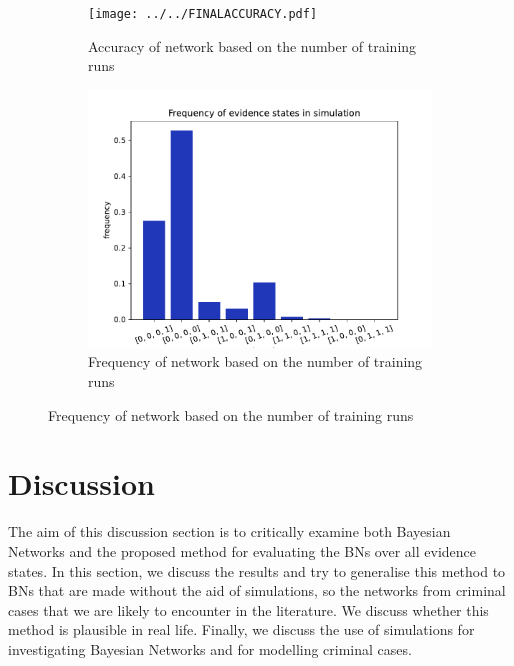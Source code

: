 \documentclass[12pt]{article}
\begin{document}
\begin{figure}[htbp]
\begin{center}
\begin{subfigure}{0.49\textwidth}
\texttt{[image: ../../FINALACCURACY.pdf]}
\caption{Accuracy of network based on the number of training runs}
\label{girl}
\end{subfigure}
\begin{subfigure}{0.49\textwidth}
\includegraphics[width=\linewidth]{GroteMarktPrivate/plots/freqStates.pdf}
\caption{Frequency of network based on the number of training runs}
\label{boy}
\end{subfigure}
\end{center}
\end{figure}




\newpage



\section{Discussion}
The aim of this discussion section is to critically examine both Bayesian Networks and the proposed method for evaluating the BNs over all evidence states. In this section, we discuss the results and try to generalise this method to BNs that are made without the aid of simulations, so the networks from criminal cases that we are likely to encounter in the literature. We discuss whether this method is plausible in real life. Finally, we discuss the use of simulations for investigating Bayesian Networks and for modelling criminal cases.
\end{document}
